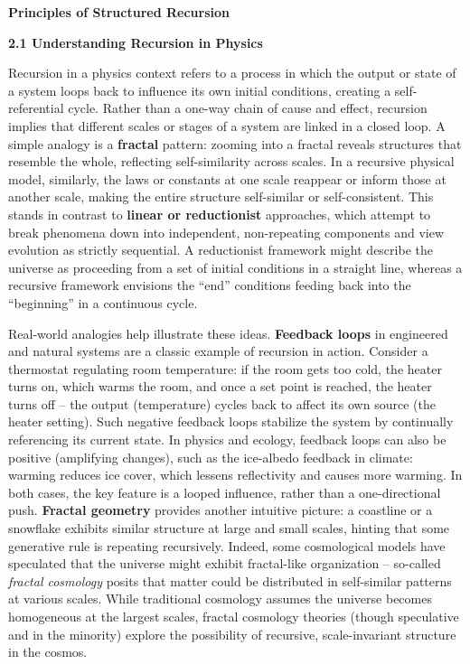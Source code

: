 \documentclass[
]{article}
\author{}
\date{}
\begin{document}
\textbf{Principles of Structured Recursion}

\textbf{2.1 Understanding Recursion in Physics}

Recursion in a physics context refers to a process in which the output
or state of a system loops back to influence its own initial conditions,
creating a self-referential cycle. Rather than a one-way chain of cause
and effect, recursion implies that different scales or stages of a
system are linked in a closed loop. A simple analogy is a
\textbf{fractal} pattern: zooming into a fractal reveals structures that
resemble the whole, reflecting self-similarity across
scales\hspace{0pt}. In a recursive physical model, similarly, the laws
or constants at one scale reappear or inform those at another scale,
making the entire structure self-similar or self-consistent. This stands
in contrast to \textbf{linear or reductionist} approaches, which attempt
to break phenomena down into independent, non-repeating components and
view evolution as strictly sequential. A reductionist framework might
describe the universe as proceeding from a set of initial conditions in
a straight line, whereas a recursive framework envisions the ``end''
conditions feeding back into the ``beginning'' in a continuous cycle.

Real-world analogies help illustrate these ideas. \textbf{Feedback
loops} in engineered and natural systems are a classic example of
recursion in action. Consider a thermostat regulating room temperature:
if the room gets too cold, the heater turns on, which warms the room,
and once a set point is reached, the heater turns off -- the output
(temperature) cycles back to affect its own source (the heater setting).
Such negative feedback loops stabilize the system by continually
referencing its current state. In physics and ecology, feedback loops
can also be positive (amplifying changes), such as the ice-albedo
feedback in climate: warming reduces ice cover, which lessens
reflectivity and causes more warming. In both cases, the key feature is
a looped influence, rather than a one-directional push. \textbf{Fractal
geometry} provides another intuitive picture: a coastline or a snowflake
exhibits similar structure at large and small scales, hinting that some
generative rule is repeating recursively. Indeed, some cosmological
models have speculated that the universe might exhibit fractal-like
organization -- so-called \emph{fractal cosmology} posits that matter
could be distributed in self-similar patterns at various
scales\hspace{0pt}. While traditional cosmology assumes the universe
becomes homogeneous at the largest scales, fractal cosmology theories
(though speculative and in the minority) explore the possibility of
recursive, scale-invariant structure in the cosmos\hspace{0pt}.
\end{document}
